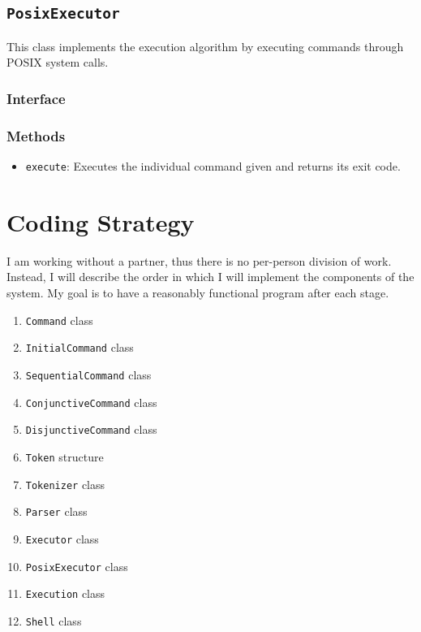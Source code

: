 \documentclass{article}
\begin{document}
  \subsection{\texttt{PosixExecutor}}

  This class implements the execution algorithm by executing commands
  through POSIX system calls.

  \subsubsection{Interface}
  

  \subsubsection{Methods}
  \begin{itemize}
    \item \texttt{execute}: Executes the individual command given and
      returns its exit code.
  \end{itemize}

  \section{Coding Strategy}

  I am working without a partner, thus there is no per-person division
  of work.  Instead, I will describe the order in which I will implement
  the components of the system.  My goal is to have a reasonably
  functional program after each stage.

  \begin{enumerate}
    \item \texttt{Command} class
    \item \texttt{InitialCommand} class
    \item \texttt{SequentialCommand} class
    \item \texttt{ConjunctiveCommand} class
    \item \texttt{DisjunctiveCommand} class
    \item \texttt{Token} structure
    \item \texttt{Tokenizer} class
    \item \texttt{Parser} class
    \item \texttt{Executor} class
    \item \texttt{PosixExecutor} class
    \item \texttt{Execution} class
    \item \texttt{Shell} class
  \end{enumerate}
\end{document}
